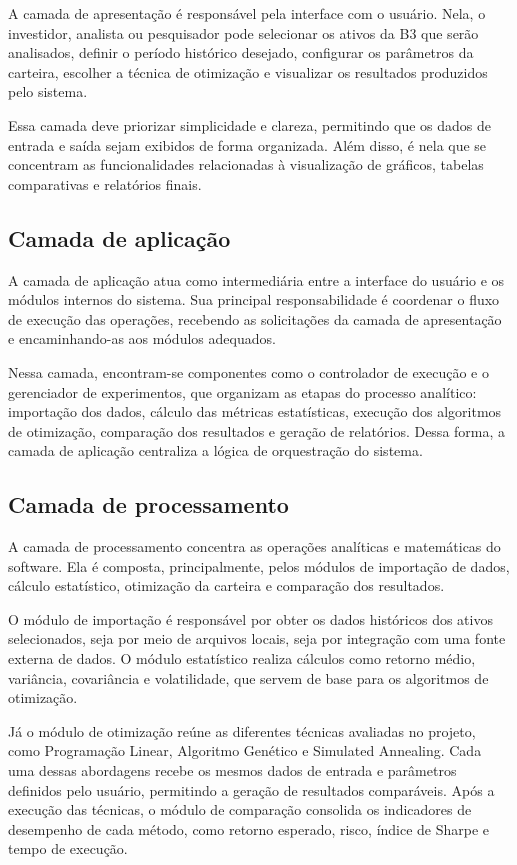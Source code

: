 \documentclass[
	12pt,				%
	openright,			%
	oneside,			    %
	a4paper,				%
	english,			%
	french,			%
	spanish,			%
	brazil			%
	]{abntex2}
\begin{document}
A camada de apresentação é responsável pela interface com o usuário. Nela, o investidor, analista ou pesquisador pode selecionar os ativos da B3 que serão analisados, definir o período histórico desejado, configurar os parâmetros da carteira, escolher a técnica de otimização e visualizar os resultados produzidos pelo sistema.

Essa camada deve priorizar simplicidade e clareza, permitindo que os dados de entrada e saída sejam exibidos de forma organizada. Além disso, é nela que se concentram as funcionalidades relacionadas à visualização de gráficos, tabelas comparativas e relatórios finais.

\subsection{Camada de aplicação}

A camada de aplicação atua como intermediária entre a interface do usuário e os módulos internos do sistema. Sua principal responsabilidade é coordenar o fluxo de execução das operações, recebendo as solicitações da camada de apresentação e encaminhando-as aos módulos adequados.

Nessa camada, encontram-se componentes como o controlador de execução e o gerenciador de experimentos, que organizam as etapas do processo analítico: importação dos dados, cálculo das métricas estatísticas, execução dos algoritmos de otimização, comparação dos resultados e geração de relatórios. Dessa forma, a camada de aplicação centraliza a lógica de orquestração do sistema.

\subsection{Camada de processamento}

A camada de processamento concentra as operações analíticas e matemáticas do software. Ela é composta, principalmente, pelos módulos de importação de dados, cálculo estatístico, otimização da carteira e comparação dos resultados.

O módulo de importação é responsável por obter os dados históricos dos ativos selecionados, seja por meio de arquivos locais, seja por integração com uma fonte externa de dados. O módulo estatístico realiza cálculos como retorno médio, variância, covariância e volatilidade, que servem de base para os algoritmos de otimização.

Já o módulo de otimização reúne as diferentes técnicas avaliadas no projeto, como Programação Linear, Algoritmo Genético e Simulated Annealing. Cada uma dessas abordagens recebe os mesmos dados de entrada e parâmetros definidos pelo usuário, permitindo a geração de resultados comparáveis. Após a execução das técnicas, o módulo de comparação consolida os indicadores de desempenho de cada método, como retorno esperado, risco, índice de Sharpe e tempo de execução.
\end{document}
